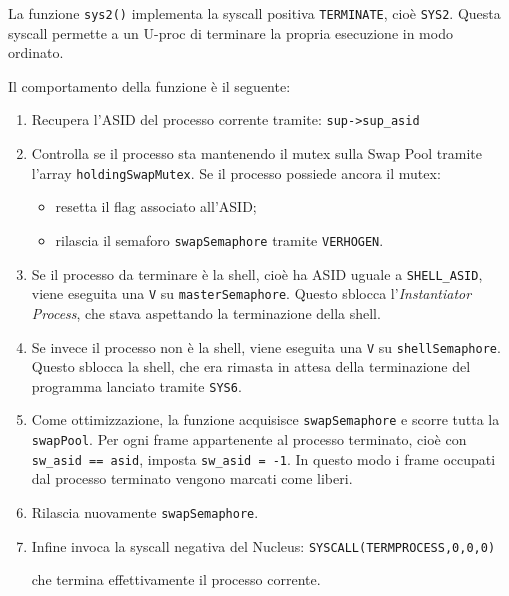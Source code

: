 \documentclass[a4paper,12pt]{article}
\begin{document}
\begin{enumerate}
La funzione \texttt{sys2()} implementa la syscall positiva \texttt{TERMINATE}, cioè \texttt{SYS2}. Questa syscall permette a un U-proc di terminare la propria esecuzione in modo ordinato.

Il comportamento della funzione è il seguente:

\begin{enumerate}
    \item Recupera l'ASID del processo corrente tramite: \texttt{sup->sup\_asid}


    \item Controlla se il processo sta mantenendo il mutex sulla Swap Pool tramite l'array \texttt{holdingSwapMutex}. Se il processo possiede ancora il mutex:
    \begin{itemize}
        \item resetta il flag associato all'ASID;
        \item rilascia il semaforo \texttt{swapSemaphore} tramite \texttt{VERHOGEN}.
    \end{itemize}

    \item Se il processo da terminare è la shell, cioè ha ASID uguale a \texttt{SHELL\_ASID}, viene eseguita una \texttt{V} su \texttt{masterSemaphore}. Questo sblocca l'\textit{Instantiator Process}, che stava aspettando la terminazione della shell.

    \item Se invece il processo non è la shell, viene eseguita una \texttt{V} su \texttt{shellSemaphore}. Questo sblocca la shell, che era rimasta in attesa della terminazione del programma lanciato tramite \texttt{SYS6}.

    \item Come ottimizzazione, la funzione acquisisce \texttt{swapSemaphore} e scorre tutta la \texttt{swapPool}. Per ogni frame appartenente al processo terminato, cioè con \texttt{sw\_asid == asid}, imposta \texttt{sw\_asid = -1}. In questo modo i frame occupati dal processo terminato vengono marcati come liberi.

    \item Rilascia nuovamente \texttt{swapSemaphore}.

    \item Infine invoca la syscall negativa del Nucleus: \texttt{SYSCALL(TERMPROCESS,0,0,0)}

    che termina effettivamente il processo corrente.
\end{enumerate}


\end{enumerate}
\end{document}
